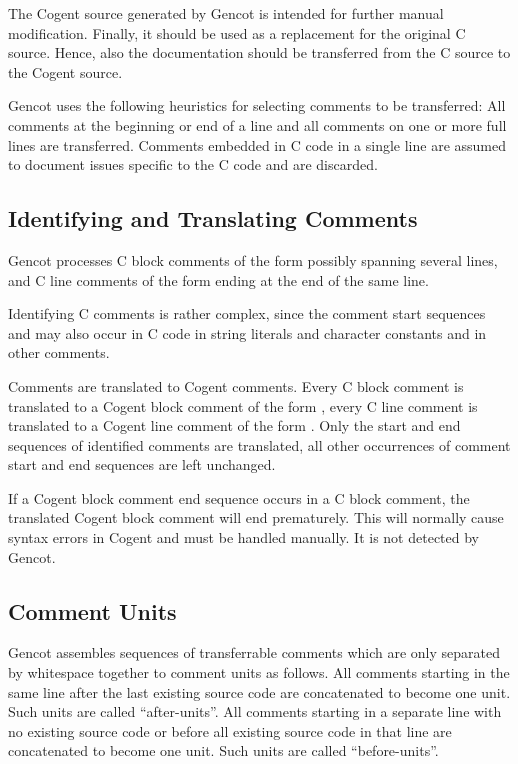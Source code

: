 
The Cogent source generated by Gencot is intended for further manual modification. Finally, it should be used as a 
replacement for the original C source. Hence, also the documentation should be transferred from the C source to
the Cogent source.

Gencot uses the following heuristics for selecting comments to be transferred: All comments at the beginning or end 
of a line and all comments on one or more full lines are transferred. Comments embedded in C code in a single line
are assumed to document issues specific to the C code and are discarded.

\subsection{Identifying and Translating Comments}

Gencot processes C block comments of the form  possibly spanning several lines, and C line comments
of the form  ending at the end of the same line.

Identifying C comments is rather complex, since the comment start sequences \code{/*} and \code{//} may also occur
in C code in string literals and character constants and in other comments. 

Comments are translated to Cogent comments. Every C block comment is translated to a Cogent block comment of the form
, every C line comment is translated to a Cogent line comment of the form . Only the 
start and end sequences of identified comments are translated, all other occurrences of comment start and end sequences
are left unchanged.

If a Cogent block comment end sequence \code{-\}} occurs in a C block comment, the translated Cogent block comment
will end prematurely. This will normally cause syntax errors in Cogent and must be handled manually. It is not
detected by Gencot.

\subsection{Comment Units}

Gencot assembles sequences of transferrable comments which are only separated by whitespace together to comment units
as follows. All comments starting in the same line after the last existing source code are concatenated to become 
one unit. Such units are called ``after-units''. All comments starting in a separate line with no existing source code 
or before all existing source code in that line are concatenated to become one unit. Such units are called ``before-units''. 

